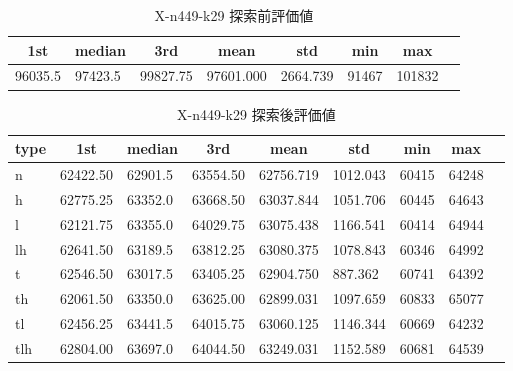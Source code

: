 \begin{table}[htbp]
    \centering
    \caption{X-n449-k29 探索前評価値}
    \begin{tabular}{|l|l|l|l|l|l|l|l|}\hline
    \multicolumn{1}{|c|}{\textbf{1st}}
    &\multicolumn{1}{c|}{\textbf{median}}
    &\multicolumn{1}{c|}{\textbf{3rd}}
    &\multicolumn{1}{c|}{\textbf{mean}}
    &\multicolumn{1}{c|}{\textbf{std}}
    &\multicolumn{1}{c|}{\textbf{min}}
    &\multicolumn{1}{c|}{\textbf{max}}\\\hline
	96035.5 & 97423.5 & 99827.75 & 97601.000 & 2664.739 & 91467 & 101832\\\hline
	\end{tabular}
\end{table}
\begin{table}[htbp]
    \centering
    \caption{X-n449-k29 探索後評価値}
    \begin{tabular}{|l|l|l|l|l|l|l|l|l|}\hline
    \multicolumn{1}{|c|}{\textbf{type}}
    &\multicolumn{1}{|c|}{\textbf{1st}}
    &\multicolumn{1}{c|}{\textbf{median}}
    &\multicolumn{1}{c|}{\textbf{3rd}}
    &\multicolumn{1}{c|}{\textbf{mean}}
    &\multicolumn{1}{c|}{\textbf{std}}
    &\multicolumn{1}{c|}{\textbf{min}}
    &\multicolumn{1}{c|}{\textbf{max}}\\\hline
	n & 62422.50 & 62901.5 & 63554.50 & 62756.719 & 1012.043 & 60415 & 64248\\\hline
	h & 62775.25 & 63352.0 & 63668.50 & 63037.844 & 1051.706 & 60445 & 64643\\\hline
	l & 62121.75 & 63355.0 & 64029.75 & 63075.438 & 1166.541 & 60414 & 64944\\\hline
	lh & 62641.50 & 63189.5 & 63812.25 & 63080.375 & 1078.843 & 60346 & 64992\\\hline
	t & 62546.50 & 63017.5 & 63405.25 & 62904.750 & 887.362 & 60741 & 64392\\\hline
	th & 62061.50 & 63350.0 & 63625.00 & 62899.031 & 1097.659 & 60833 & 65077\\\hline
	tl & 62456.25 & 63441.5 & 64015.75 & 63060.125 & 1146.344 & 60669 & 64232\\\hline
	tlh & 62804.00 & 63697.0 & 64044.50 & 63249.031 & 1152.589 & 60681 & 64539\\\hline
	\end{tabular}
\end{table}
